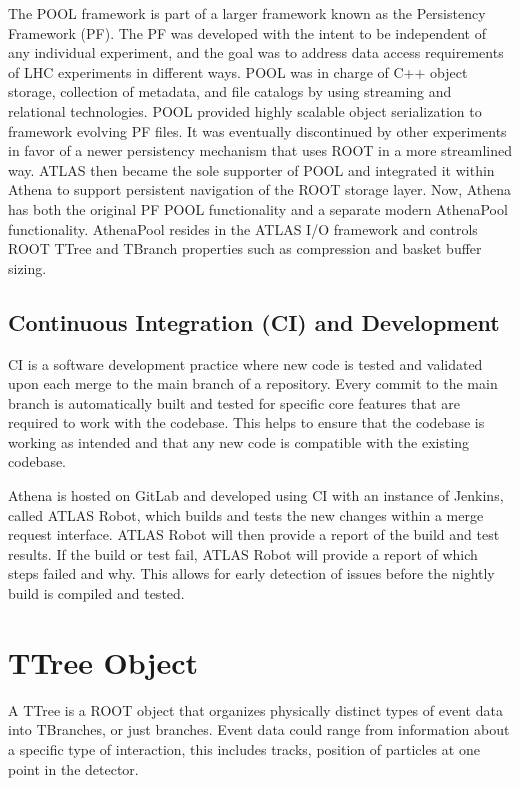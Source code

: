 The POOL framework is part of a larger framework known as the Persistency Framework (PF). \cite{Trentadue_2012}
The PF was developed with the intent to be independent of any individual experiment, and the goal was to address data access requirements of LHC experiments in different ways.
POOL was in charge of C++ object storage, collection of metadata, and file catalogs by using streaming and relational technologies. 
POOL provided highly scalable object serialization to framework evolving PF files. 
It was eventually discontinued by other experiments in favor of a newer persistency mechanism that uses ROOT in a more streamlined way.
ATLAS then became the sole supporter of POOL and integrated it within Athena to support persistent navigation of the ROOT storage layer.
Now, Athena has both the original PF POOL functionality and a separate modern AthenaPool functionality. 
AthenaPool resides in the ATLAS I/O framework and controls ROOT TTree and TBranch properties such as compression and basket buffer sizing.


\subsection{Continuous Integration (CI) and Development}
CI is a software development practice where new code is tested and validated upon each merge to the main branch of a repository. 
Every commit to the main branch is automatically built and tested for specific core features that are required to work with the codebase. 
This helps to ensure that the codebase is working as intended and that any new code is compatible with the existing codebase.

Athena is hosted on GitLab and developed using CI with an instance of Jenkins, called ATLAS Robot, which builds and tests the new changes within a merge request interface.\cite{athena-gitlab}\cite{Jenkins}
ATLAS Robot will then provide a report of the build and test results.
If the build or test fail, ATLAS Robot will provide a report of which steps failed and why.
This allows for early detection of issues before the nightly build is compiled and tested.



\section{TTree Object} \label{section: ATLASIO_TTreeObject}
A TTree is a ROOT object that organizes physically distinct types of event data into TBranches, or just branches.
Event data could range from information about a specific type of interaction, this includes tracks, position of particles at one point in the detector. 

